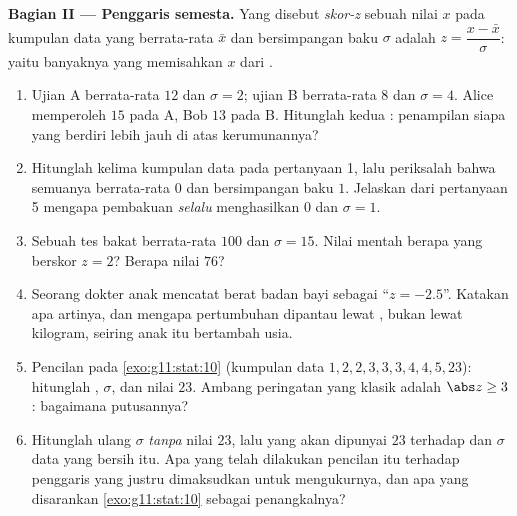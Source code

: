\begin{problem}
\medskip
\noindent\textbf{Bagian II --- Penggaris semesta.}
Yang disebut \emph{skor-z} sebuah nilai $x$ pada kumpulan data yang
berrata-rata $\bar x$ dan bersimpangan baku $\sigma$ adalah
$z = \dfrac{x - \bar x}{\sigma}$: yaitu banyaknya 
yang memisahkan $x$ dari .
\begin{enumerate}[resume]
  \item Ujian A berrata-rata $12$ dan $\sigma = 2$; ujian B berrata-rata
        $8$ dan $\sigma = 4$. Alice memperoleh $15$ pada A, Bob $13$
        pada B. Hitunglah kedua : penampilan siapa yang berdiri
        lebih jauh di atas kerumunannya?
  \item Hitunglah kelima  kumpulan data pada pertanyaan 1,
        lalu periksalah bahwa semuanya berrata-rata $0$ dan bersimpangan
        baku $1$. Jelaskan dari pertanyaan 5 mengapa
        pembakuan \emph{selalu} menghasilkan  $0$ dan
        $\sigma = 1$.
  \item Sebuah tes bakat berrata-rata $100$ dan $\sigma = 15$. Nilai
        mentah berapa yang berskor $z = 2$? Berapa  nilai $76$?
  \item Seorang dokter anak mencatat berat badan bayi
        sebagai ``$z = -2.5$''. Katakan apa artinya, dan mengapa pertumbuhan
        dipantau lewat , bukan lewat kilogram, seiring anak itu
        bertambah usia.
  \item Pencilan pada \cref{exo:g11:stat:10} (kumpulan data
        $1, 2, 2, 3, 3, 3, 4, 4, 5, 23$): hitunglah ,
        $\sigma$, dan  nilai $23$. Ambang peringatan yang
        klasik adalah $\abs z \geq 3$: bagaimana putusannya?
  \item Hitunglah ulang $\sigma$ \emph{tanpa} nilai $23$, lalu
         yang akan dipunyai $23$ terhadap  dan $\sigma$
        data yang bersih itu. Apa yang telah dilakukan pencilan itu terhadap
        penggaris yang justru dimaksudkan untuk mengukurnya, dan apa yang
        disarankan \cref{exo:g11:stat:10} sebagai penangkalnya?
\end{enumerate}


\end{problem}
